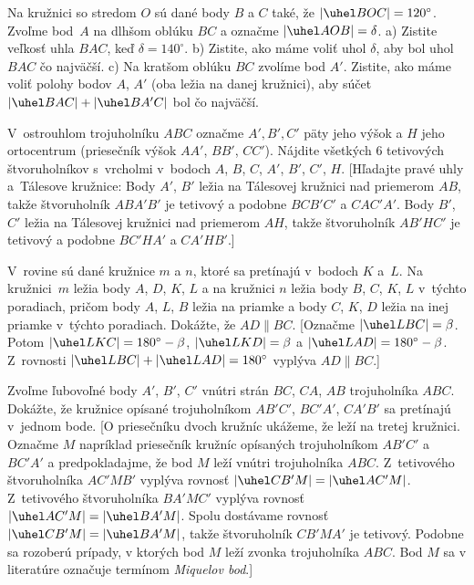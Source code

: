 {Na kružnici so stredom $O$ sú dané body $B$ a $C$ také, že
$|\uhel BOC|=120^\circ$. Zvoľme bod~$A$ na
dlhšom oblúku $BC$ a označme $|\uhel AOB|=\delta$.\hb
a) Zistite veľkosť uhla $BAC$, keď
$\delta=140^\circ$.\hb
b) Zistite, ako máme voliť uhol $\delta$, aby bol uhol $BAC$ čo najväčší.\hb
c) Na kratšom oblúku $BC$ zvolíme bod $A'$.
Zistite, ako máme voliť polohy bodov $A$, $A'$
(oba ležia na danej kružnici), aby súčet $|\uhel BAC|+|\uhel BA'C|$
bol čo najväčší.\hp
[V~rovnoramenných trojuholníkoch $BOC$, $COA$ a $AOB$ spočítajte
uhly, alebo ich vyjadrite v~závislosti od uhla $\delta$. V~a)
vyjde $|\uhel BAC|=60^\circ$, rovnako ako v~b) nezávisle na
voľbe~$\delta$. V~c) vyjde súčet $180^\circ$ nezávisle na
polohe bodu~$A$ alebo $A'$. Tvrdenie c) má známe zovšeobecnenie:
Štvoruholník je tetivový práve vtedy, keď súčet veľkostí jeho
protiľahlých uhlov je $180^\circ$.]

\DOP
V~ostrouhlom trojuholníku $ABC$
označme $A', B', C'$ päty jeho výšok a $H$ jeho ortocentrum
(priesečník výšok $AA'$, $BB'$, $CC'$). Nájdite všetkých $6$
tetivových štvoruholníkov s~vrcholmi v~bodoch $A$, $B$, $C$, $A'$, $B'$,
$C'$, $H$.
[Hľadajte pravé uhly a~Tálesove kružnice: Body $A'$, $B'$
ležia na Tálesovej kružnici nad priemerom $AB$, takže štvoruholník
$ABA'B'$ je tetivový a podobne $BCB'C'$ a $CAC'A'$. Body $B'$,
$C'$ ležia na Tálesovej kružnici nad priemerom $AH$, takže
štvoruholník $AB'HC'$ je tetivový a podobne $BC'HA'$ a $CA'HB'$.]

V~rovine sú dané kružnice $m$ a $n$, ktoré sa pretínajú v~bodoch
$K$ a~$L$. Na kružnici~$m$ ležia body $A$, $D$, $K$, $L$ a na
kružnici $n$ ležia body $B$, $C$, $K$, $L$ v~týchto poradiach,
pričom body $A$, $L$, $B$ ležia na priamke a body $C$, $K$, $D$
ležia na inej priamke v~týchto poradiach. Dokážte, že $AD \parallel BC$.
[Označme $|\uhel
LBC|=\beta$. Potom $|\uhel LKC|={180^\circ-\beta}$, $|\uhel LKD|=\beta$
a $|\uhel LAD|=180^\circ-\beta$. Z~rovnosti $|\uhel LBC|+|\uhel
LAD|=180^\circ$ vyplýva $AD\parallel BC$.]

Zvoľme ľubovoľné body $A'$, $B'$,
$C'$ vnútri strán $BC$, $CA$, $AB$ trojuholníka $ABC$. Dokážte,
že kružnice opísané trojuholníkom $AB'C'$, $BC'A'$, $CA'B'$ sa
pretínajú v~jednom bode.
[O priesečníku dvoch kružníc ukážeme, že leží na tretej kružnici. Označme $M$ napríklad priesečník kružníc opísaných trojuholníkom $AB'C'$ a $BC'A'$ a predpokladajme, že bod $M$ leží vnútri trojuholníka $ABC$. Z~tetivového štvoruholníka $AC'MB'$ vyplýva rovnosť $|\uhel CB'M|=|\uhel AC'M|$. Z~tetivového štvoruholníka $BA'MC'$ vyplýva rovnosť $|\uhel AC'M|=|\uhel BA'M|$. Spolu dostávame rovnosť $|\uhel CB'M|=|\uhel BA'M|$, takže štvoruholník
$CB'MA'$ je tetivový. Podobne sa rozoberú prípady, v ktorých bod $M$ leží zvonka trojuholníka $ABC$. Bod $M$ sa v literatúre označuje termínom {\it Miquelov bod}.]

}

